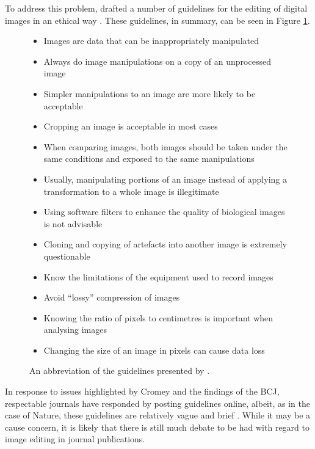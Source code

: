 \documentclass[british,a4paper, 12pt]{article}
\begin{document}
To address this problem, \citeauthor*{cromey2001digital} drafted a number of guidelines for
the editing of digital images in an ethical way \parencite{cromey2001digital}. These guidelines,
in summary, can be seen in Figure \ref{fig:ethicalguidelines}.

\begin{figure}

\begin{itemize}
\item Images are data that can be inappropriately manipulated
\item Always do image manipulations on a copy of an unprocessed image
\item Simpler manipulations to an image are more likely to be acceptable
\item Cropping an image is acceptable in most cases
\item When comparing images, both images should be taken under the same conditions and exposed to the same manipulations
\item Usually, manipulating portions of an image instead of applying a transformation to a whole image is illegitimate
\item Using software filters to enhance the quality of biological images is not advisable
\item Cloning and copying of artefacts into another image is extremely questionable
\item Know the limitations of the equipment used to record images
\item Avoid ``lossy'' compression of images
\item Knowing the ratio of pixels to centimetres is important when analysing images
\item Changing the size of an image in pixels can cause data loss
\end{itemize}

\caption{An abbreviation of the guidelines presented by \parencite{cromey2001digital}.}
\label{fig:ethicalguidelines}
\end{figure}


In response to issues highlighted by Cromey and the findings of the BCJ, respectable
journals have responded by posting guidelines online, albeit, as in the case of Nature,
these guidelines are relatively vague and brief \parencite{natureimg}. While it may be a
cause concern, it is likely that there is still much debate to be had with regard to image
editing in journal publications.
\end{document}
